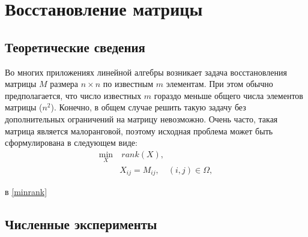 \section{Восстановление матрицы}
	 \subsection{Теоретические сведения}
	 \par Во многих приложениях линейной алгебры возникает задача восстановления матрицы $M$ размера $n \times n$
	      по известным $m$ элементам. При этом обычно предполагается, что число  известных $m$ гораздо
	      меньше общего числа элементов матрицы ($n^2$).  Конечно, в общем случае решить такую задачу без дополнительных
	      ограничений на матрицу невозможно. Очень часто, такая матрица является малоранговой, поэтому исходная проблема 
	      может быть сформулирована в следующем виде:
	  \begin{align}\label{minrank}
	    \min\limits_X & \  rank(X), \\
	   & X_{ij} = M_{ij}, \quad (i,j) \in \Omega, 
	  \end{align}
	  
	  в \eqref{minrank}

         \clearpage
	  \subsection{Численные эксперименты}

